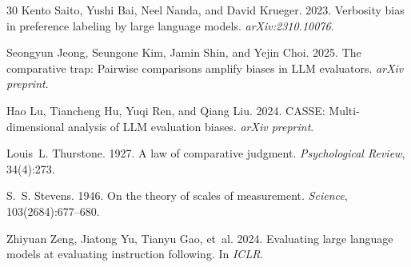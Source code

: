\documentclass[11pt,a4paper]{article}
\begin{document}
\begin{thebibliography}{30}
Kento Saito, Yushi Bai, Neel Nanda, and David Krueger. 2023.
Verbosity bias in preference labeling by large language models.
\emph{arXiv:2310.10076}.

Seongyun Jeong, Seungone Kim, Jamin Shin, and Yejin Choi. 2025.
The comparative trap: Pairwise comparisons amplify biases in LLM evaluators.
\emph{arXiv preprint}.

Hao Lu, Tiancheng Hu, Yuqi Ren, and Qiang Liu. 2024.
CASSE: Multi-dimensional analysis of LLM evaluation biases.
\emph{arXiv preprint}.

Louis~L. Thurstone. 1927.
A law of comparative judgment.
\emph{Psychological Review}, 34(4):273.

S.~S. Stevens. 1946.
On the theory of scales of measurement.
\emph{Science}, 103(2684):677--680.

Zhiyuan Zeng, Jiatong Yu, Tianyu Gao, et~al. 2024.
Evaluating large language models at evaluating instruction following.
In \emph{ICLR}.

\end{thebibliography}
\end{document}
